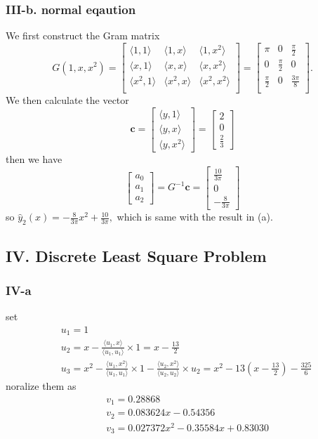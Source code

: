 \documentclass[a4paper]{article}
\newcommand{\innerProduct}[2]{\langle #1 , #2\rangle}
\begin{document}
\subsubsection*{III-b. normal eqaution}
We first construct the Gram matrix
\[
G(1,x ,x^2) =
\begin{bmatrix}
    \innerProduct{1}{1} &\innerProduct{1}{x}&\innerProduct{1}{x^2}\\
    \innerProduct{x}{1} &\innerProduct{x}{x}&\innerProduct{x}{x^2}\\
    \innerProduct{x^2}{1} &\innerProduct{x^2}{x}&\innerProduct{x^2}{x^2}\\
\end{bmatrix}=
\begin{bmatrix}
    \pi     &0      &\frac{\pi}{2}     \\
    0       &\frac{\pi}{2}       &0    \\
    \frac{\pi}{2}        &0      &\frac{3\pi}{8}     \\
\end{bmatrix}.
\]
We then calculate the vector
\[
\mathbf{c} = \begin{bmatrix}
    \innerProduct{y}{1} \\ \innerProduct{y}{x}\\ \innerProduct{y}{x^2}
\end{bmatrix} = \begin{bmatrix}
    2\\0\\\frac{2}{3}
\end{bmatrix}
\]
then we have\[
\begin{bmatrix}
    a_0\\a_1\\a_2
\end{bmatrix} = G^{-1}\mathbf{c} = \begin{bmatrix}
    \frac{10}{3\pi} \\ 0 \\ -\frac{8}{3\pi}
\end{bmatrix}
\]
so \(\hat{y}_2(x) = -\frac{8}{3\pi}
x^2 + \frac{10}{3\pi},\) which is same with the result in (a).

\subsection*{IV. Discrete Least Square Problem}
\subsubsection*{IV-a}
set \begin{align*}
&u_1 = 1\\
&u_2 = x - \frac{\innerProduct{u_1}{x}}{\innerProduct{u_1}{u_1}}\times 1 = x - \frac{13}{2}\\
&u_3 = x^2 - \frac{\innerProduct{u_1}{x^2}}{\innerProduct{u_1}{u_1}}\times 1 - \frac{\innerProduct{u_2}{x^2}}{\innerProduct{u_2}{u_2}}\times u_2 = x^2 - 13(x-\frac{13}{2}) - \frac{325}{6}
\end{align*}
noralize them as \begin{align*}
    &v_1 = 0.28868\\\
&v_2 = 0.083624x - 0.54356\\
&v_3 =0.027372 x^2 - 0.35584 x + 0.83030
\end{align*}
\end{document}
